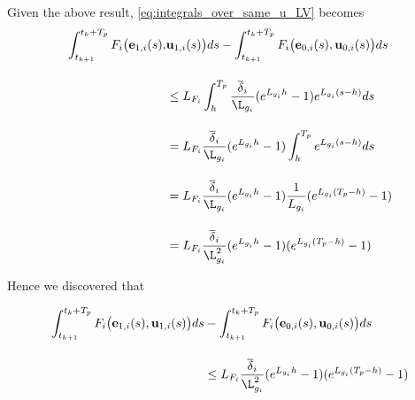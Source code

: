 Given the above result, \eqref{eq:integrals_over_same_u_LV} becomes
\begin{align}
  \int_{t_{k+1}}^{t_k + T_p} F_i \big(\vect{e}_{1,i}(s),& \vect{u}_{1,i} (s)\big) d s
    - \int_{t_{k+1}}^{t_k + T_p} F_i \big(\vect{e}_{0,i}(s), \vect{u}_{0,i} (s)\big) d s \\[2.5ex]
  & \leq L_{F_i}\int_{h}^{T_p} \dfrac{\overline{\delta}_i}{\L_{g_i}} (e^{L_{g_i}h} - 1) e^{L_{g_i}(s-h)} d s \\[2.5ex]
  &=  L_{F_i} \dfrac{\overline{\delta}_i}{\L_{g_i}} (e^{L_{g_i}h} - 1) \int_{h}^{T_p} e^{L_{g_i}(s-h)} d s \\[2.5ex]
  & = L_{F_i} \dfrac{\overline{\delta}_i}{\L_{g_i}} (e^{L_{g_i} h} - 1) \dfrac{1}{L_{g_i}}(e^{L_{g_i}(T_p-h)} - 1) \\[2.5ex]
  & = L_{F_i} \dfrac{\overline{\delta}_i}{\L_{g_i}^2} (e^{L_{g_i} h} - 1) (e^{L_{g_i}(T_p-h)} - 1)
\end{align}


Hence we discovered that
\begin{bw_box}
\begin{align}
  \int_{t_{k+1}}^{t_k + T_p} F_i \big(\vect{e}_{1,i}(s), \vect{u}_{1,i} (s)\big) d s
  &- \int_{t_{k+1}}^{t_k + T_p} F_i \big(\vect{e}_{0,i}(s), \vect{u}_{0,i} (s)\big) d s \\[2.5ex]
  & \leq L_{F_i} \dfrac{\overline{\delta}_i}{\L_{g_i}^2} (e^{L_{g_i} h} - 1) (e^{L_{g_i}(T_p-h)} - 1)
\label{eq:end_result_two_integrals}
\end{align}
\end{bw_box}

